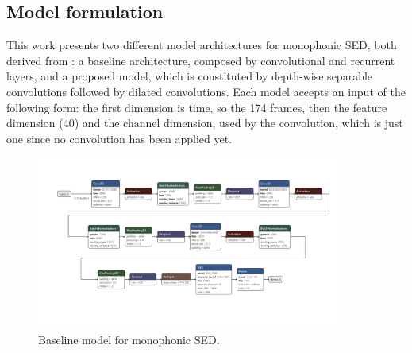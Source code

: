 \documentclass{article}
\begin{document}
\subsection{Model formulation}
\label{subsec:mono_model}

This work presents two different model architectures for monophonic SED, both derived from \cite{drossos2020sound}: a baseline architecture, composed by convolutional and recurrent layers, and a proposed model, which is constituted by depth-wise separable convolutions followed by dilated convolutions.\newline
Each model accepts an input of the following form: the first dimension is time, so the 174 frames, then the feature dimension (40) and the channel dimension, used by the convolution, which is just one since no convolution has been applied yet.

\begin{figure}[H]
	\centering
	\includegraphics[width=0.9\textwidth]{./images/mono/baseline.png}	
	\caption{Baseline model for monophonic SED.}
	\label{fig:mono_baseline}
\end{figure}
\end{document}
